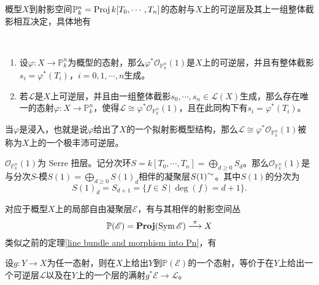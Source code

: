 概型$X$到射影空间$\mathbb{P}_k^n = \operatorname{Proj} k[T_0,\cdots,T_n]$的态射与$X$上的可逆层及其上一组整体截影相互决定，具体地有
\begin{theorem}
\label{line bundle and morphism into Pn}
\
\begin{enumerate}
\item 设$\varphi: X \rightarrow \mathbb{P}_k^n$为概型的态射，那么$\varphi^*\mathcal{O}_{\mathbb{P}_k^n}(1)$是$X$上的可逆层，并且有整体截影$s_i = \varphi^*(T_i)$，$i=0,1,\cdots,n$生成。
\item 若$\mathscr{L}$是$X$上可逆层，并且由一组整体截影$s_0, \cdots, s_n\in \mathscr{L}(X)$生成，那么存在唯一的态射$\varphi: X \rightarrow \mathbb{P}_k^n$，使得$\mathscr{L}\cong \varphi^*\mathcal{O}_{\mathbb{P}_k^n}(1)$，且在此同构下有$s_i = \varphi^*(T_i)$。
\end{enumerate}
\end{theorem}

当$\varphi$是浸入，也就是说$\varphi$给出了$X$的一个拟射影概型结构，那么$\mathscr{L}\cong \varphi^*\mathcal{O}_{\mathbb{P}_k^n}(1)$被称为$X$上的一个极丰沛可逆层。

$\mathcal{O}_{\mathbb{P}_k^n}(1)$为 Serre 扭层。记分次环$S = k[T_0,\cdots,T_n] = \bigoplus\limits_{d\geqslant0}S_d$。那么$\mathcal{O}_{\mathbb{P}_k^n}(1)$是与分次$S$-模$S(1) = \bigoplus\limits_{d\geqslant0}S(1)_d$相伴的凝聚层$S(1)^{\mbox{$\sim$}}$。其中$S(1)$的分次为
\begin{equation}
S(1)_d = S_{d+1} = \{ f\in S \ |\ \deg(f) = d+1 \}.
\end{equation}

对应于概型$X$上的局部自由凝聚层$\mathscr{E}$，有与其相伴的射影空间丛
\begin{equation}
\mathbb{P}(\mathscr{E}) = \operatorname{\mathbf{Proj}}(\operatorname{Sym}\mathscr{E}) \overset{\pi}{\longrightarrow} X
\end{equation}
类似之前的定理\ref{line bundle and morphism into Pn}，有
\begin{proposition}
设$g: Y \rightarrow X$为任一态射，则在$X$上给出$Y$到$\mathbb{P}(\mathscr{E})$的一个态射，等价于在$Y$上给出一个可逆层$\mathscr{L}$以及在$Y$上的一个层的满射$g^*\mathscr{E} \rightarrow \mathscr{L}$。
\end{proposition}

